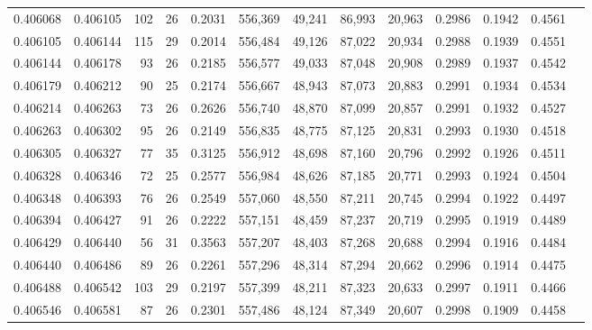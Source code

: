 \begin{tabular}{rrrrrrrrrrrrr}
0.406068 & 0.406105 &   102 &  26 &                                     0.2031 & 556,369 &  49,241 &  86,993 &  20,963 & 0.2986 & 0.1942 & 0.4561 \\
0.406105 & 0.406144 &   115 &  29 &                                     0.2014 & 556,484 &  49,126 &  87,022 &  20,934 & 0.2988 & 0.1939 & 0.4551 \\
0.406144 & 0.406178 &    93 &  26 &                                     0.2185 & 556,577 &  49,033 &  87,048 &  20,908 & 0.2989 & 0.1937 & 0.4542 \\
0.406179 & 0.406212 &    90 &  25 &                                     0.2174 & 556,667 &  48,943 &  87,073 &  20,883 & 0.2991 & 0.1934 & 0.4534 \\
0.406214 & 0.406263 &    73 &  26 &                                     0.2626 & 556,740 &  48,870 &  87,099 &  20,857 & 0.2991 & 0.1932 & 0.4527 \\
0.406263 & 0.406302 &    95 &  26 &                                     0.2149 & 556,835 &  48,775 &  87,125 &  20,831 & 0.2993 & 0.1930 & 0.4518 \\
0.406305 & 0.406327 &    77 &  35 &                                     0.3125 & 556,912 &  48,698 &  87,160 &  20,796 & 0.2992 & 0.1926 & 0.4511 \\
0.406328 & 0.406346 &    72 &  25 &                                     0.2577 & 556,984 &  48,626 &  87,185 &  20,771 & 0.2993 & 0.1924 & 0.4504 \\
0.406348 & 0.406393 &    76 &  26 &                                     0.2549 & 557,060 &  48,550 &  87,211 &  20,745 & 0.2994 & 0.1922 & 0.4497 \\
0.406394 & 0.406427 &    91 &  26 &                                     0.2222 & 557,151 &  48,459 &  87,237 &  20,719 & 0.2995 & 0.1919 & 0.4489 \\
0.406429 & 0.406440 &    56 &  31 &                                     0.3563 & 557,207 &  48,403 &  87,268 &  20,688 & 0.2994 & 0.1916 & 0.4484 \\
0.406440 & 0.406486 &    89 &  26 &                                     0.2261 & 557,296 &  48,314 &  87,294 &  20,662 & 0.2996 & 0.1914 & 0.4475 \\
0.406488 & 0.406542 &   103 &  29 &                                     0.2197 & 557,399 &  48,211 &  87,323 &  20,633 & 0.2997 & 0.1911 & 0.4466 \\
0.406546 & 0.406581 &    87 &  26 &                                     0.2301 & 557,486 &  48,124 &  87,349 &  20,607 & 0.2998 & 0.1909 & 0.4458 \\

\end{tabular}
